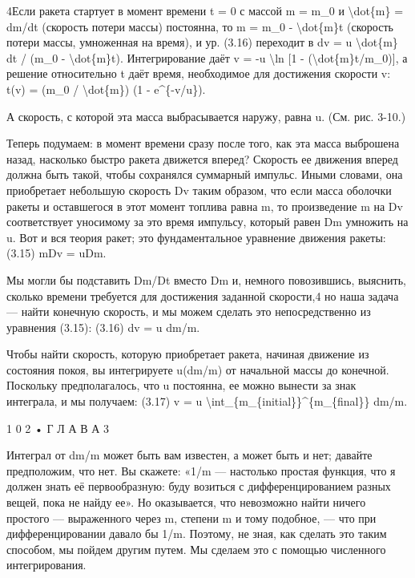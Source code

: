 \documentclass[10pt,oneside]{article}
\begin{document}
4Если ракета стартует в момент времени t = 0 с массой m = m\_0 и \textbackslash{}dot\{m\} = dm/dt (скорость потери массы) постоянна, то m = m\_0 - \textbackslash{}dot\{m\}t (скорость потери массы, умноженная на время), и ур. (3.16) переходит в dv = u \textbackslash{}dot\{m\} dt / (m\_0 - \textbackslash{}dot\{m\}t). Интегрирование даёт v = -u \textbackslash{}ln [1 - (\textbackslash{}dot\{m\}t/m\_0)], а решение относительно t даёт время, необходимое для достижения скорости v: t(v) = (m\_0 / \textbackslash{}dot\{m\}) (1 - e\textasciicircum{}\{-v/u\}).\par

А скорость, с которой эта масса выбрасывается наружу, равна u. (См. рис. 3-10.)\par

Теперь подумаем: в момент времени сразу после того, как эта масса выброшена назад, насколько быстро ракета движется вперед? Скорость ее движения вперед должна быть такой, чтобы сохранялся суммарный импульс. Иными словами, она приобретает небольшую скорость Dv таким образом, что если масса оболочки ракеты и оставшегося в этот момент топлива равна m, то произведение m на Dv соответствует уносимому за это время импульсу, который равен Dm умножить на u. Вот и вся теория ракет; это фундаментальное уравнение движения ракеты: (3.15) mDv = uDm.\par

Мы могли бы подставить Dm/Dt вместо Dm и, немного повозившись, выяснить, сколько времени требуется для достижения заданной скорости,4 но наша задача --- найти конечную скорость, и мы можем сделать это непосредственно из уравнения (3.15): (3.16) dv = u dm/m.\par

Чтобы найти скорость, которую приобретает ракета, начиная движение из состояния покоя, вы интегрируете u(dm/m) от начальной массы до конечной. Поскольку предполагалось, что u постоянна, ее можно вынести за знак интеграла, и мы получаем: (3.17) v = u \textbackslash{}int\_\{m\_\{initial\}\}\textasciicircum{}\{m\_\{final\}\} dm/m.\par

1 0 2 • Г Л А В А  3\par

Интеграл от dm/m может быть вам известен, а может быть и нет; давайте предположим, что нет. Вы скажете: «1/m --- настолько простая функция, что я должен знать её первообразную: буду возиться с дифференцированием разных вещей, пока не найду ее». Но оказывается, что невозможно найти ничего простого --- выраженного через m, степени m и тому подобное, --- что при дифференцировании давало бы 1/m. Поэтому, не зная, как сделать это таким способом, мы пойдем другим путем. Мы сделаем это с помощью численного интегрирования.\par
\end{document}
